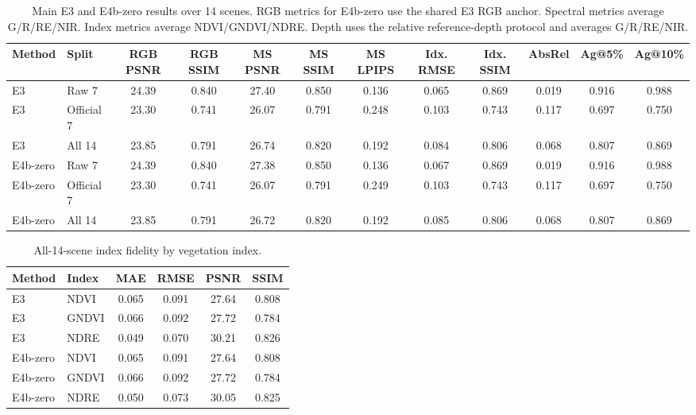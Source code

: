 ﻿%

\begin{table}[t]
    \caption{Main E3 and E4b-zero results over 14 scenes. RGB metrics for E4b-zero use the shared E3 RGB anchor. Spectral metrics average G/R/RE/NIR. Index metrics average NDVI/GNDVI/NDRE. Depth uses the relative reference-depth protocol and averages G/R/RE/NIR.}
    \label{tab:main14}
    \centering
    \scriptsize
    \setlength{\tabcolsep}{3pt}
    \begin{tabular}{llcccccccccc}
        \toprule
        Method & Split & RGB PSNR & RGB SSIM & MS PSNR & MS SSIM & MS LPIPS & Idx. RMSE & Idx. SSIM & AbsRel & Ag@5\% & Ag@10\% \\
        \midrule
        E3 & Raw 7 & 24.39 & 0.840 & 27.40 & 0.850 & 0.136 & 0.065 & 0.869 & 0.019 & 0.916 & 0.988 \\
        E3 & Official 7 & 23.30 & 0.741 & 26.07 & 0.791 & 0.248 & 0.103 & 0.743 & 0.117 & 0.697 & 0.750 \\
        E3 & All 14 & 23.85 & 0.791 & 26.74 & 0.820 & 0.192 & 0.084 & 0.806 & 0.068 & 0.807 & 0.869 \\
        \midrule
        E4b-zero & Raw 7 & 24.39 & 0.840 & 27.38 & 0.850 & 0.136 & 0.067 & 0.869 & 0.019 & 0.916 & 0.988 \\
        E4b-zero & Official 7 & 23.30 & 0.741 & 26.07 & 0.791 & 0.249 & 0.103 & 0.743 & 0.117 & 0.697 & 0.750 \\
        E4b-zero & All 14 & 23.85 & 0.791 & 26.72 & 0.820 & 0.192 & 0.085 & 0.806 & 0.068 & 0.807 & 0.869 \\
        \bottomrule
    \end{tabular}
\end{table}

\begin{table}[t]
    \caption{All-14-scene index fidelity by vegetation index.}
    \label{tab:index-detail}
    \centering
    \small
    \begin{tabular}{llcccc}
        \toprule
        Method & Index & MAE & RMSE & PSNR & SSIM \\
        \midrule
        E3 & NDVI & 0.065 & 0.091 & 27.64 & 0.808 \\
        E3 & GNDVI & 0.066 & 0.092 & 27.72 & 0.784 \\
        E3 & NDRE & 0.049 & 0.070 & 30.21 & 0.826 \\
        \midrule
        E4b-zero & NDVI & 0.065 & 0.091 & 27.64 & 0.808 \\
        E4b-zero & GNDVI & 0.066 & 0.092 & 27.72 & 0.784 \\
        E4b-zero & NDRE & 0.050 & 0.073 & 30.05 & 0.825 \\
        \bottomrule
    \end{tabular}
\end{table}

